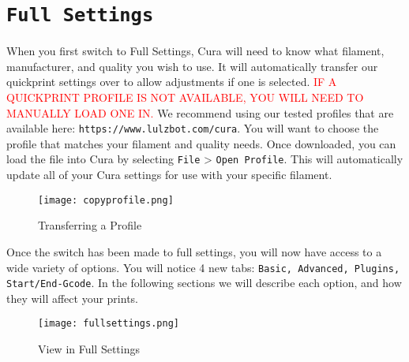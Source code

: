 \section{\texttt{Full Settings}}
When you first switch to Full Settings, Cura will need to know what filament, manufacturer, and quality you wish to use. It will automatically transfer our quickprint settings over to allow adjustments if one is selected. \textcolor{red}{IF A QUICKPRINT PROFILE IS NOT AVAILABLE, YOU WILL NEED TO MANUALLY LOAD ONE IN.} We recommend using our tested profiles that are available here: \texttt{https://www.lulzbot.com/cura}. You will want to choose the profile that matches your filament and quality needs. Once downloaded, you can load the file into Cura by selecting \texttt{File} > \texttt{Open Profile}. This will automatically update all of your Cura settings for use with your specific filament.
\begin{figure}[H]
\centering
\texttt{[image: copyprofile.png]}
\caption{Transferring a Profile}
\label{fig:Transferring a Profile}
\end{figure}
Once the switch has been made to full settings, you will now have access to a wide variety of options. You will notice 4 new tabs: \texttt{Basic, Advanced, Plugins, Start/End-Gcode}. In the following sections we will describe each option, and how they will affect your prints.
\begin{figure}[H]
\centering
\texttt{[image: fullsettings.png]}
\caption{View in Full Settings}
\label{fig:View in Full Settings}
\end{figure}


